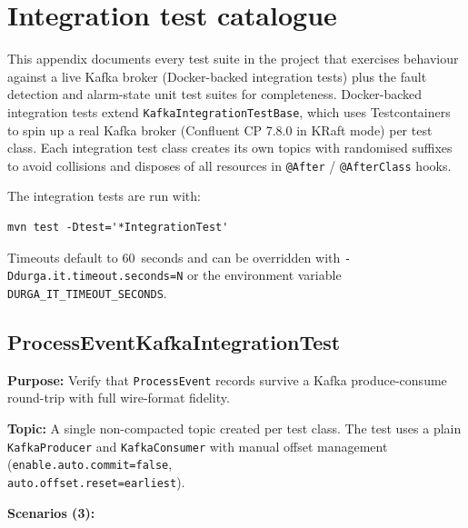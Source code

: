\appendix
\section{Integration test catalogue}
\label{sec:IntegrationTestAppendix}

This appendix documents every test suite in the project that exercises
behaviour against a live Kafka broker (Docker-backed integration tests)
plus the fault detection and alarm-state unit test suites for completeness.
Docker-backed integration tests extend \texttt{KafkaIntegrationTestBase}, which
uses Testcontainers to spin up a real Kafka broker (Confluent CP 7.8.0 in KRaft
mode) per test class. Each integration test class creates its own topics with
randomised suffixes to avoid collisions and disposes of all resources in
\texttt{@After} / \texttt{@AfterClass} hooks.

The integration tests are run with:

\begin{verbatim}
mvn test -Dtest='*IntegrationTest'
\end{verbatim}

Timeouts default to 60~seconds and can be overridden with
\texttt{-Ddurga.it.timeout.seconds=N} or the environment variable
\texttt{DURGA\_IT\_TIMEOUT\_SECONDS}.


\subsection{ProcessEventKafkaIntegrationTest}
\label{it:processEventKafka}

\textbf{Purpose:} Verify that \texttt{ProcessEvent} records survive a
Kafka produce-consume round-trip with full wire-format fidelity.

\textbf{Topic:} A single non-compacted topic created per test class.
The test uses a plain \texttt{KafkaProducer} and \texttt{KafkaConsumer} with
manual offset management (\texttt{enable.auto.commit=false}, \\
\texttt{auto.offset.reset=earliest}).

\textbf{Scenarios (3):}

